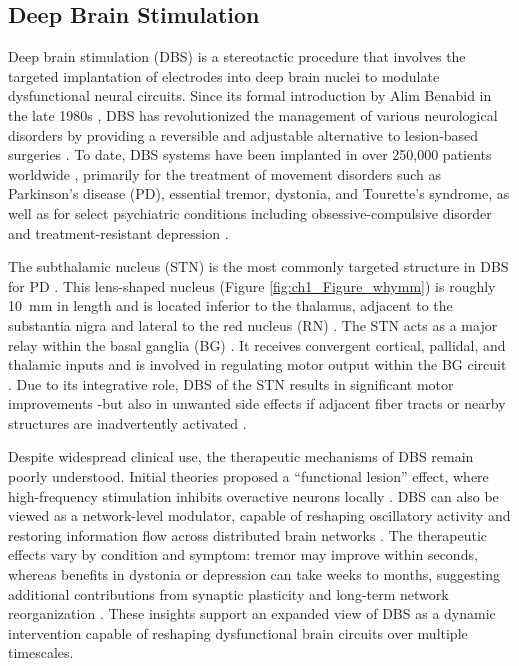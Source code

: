 \subsection{Deep Brain Stimulation}
Deep brain stimulation (DBS) is a stereotactic procedure that involves the targeted implantation of electrodes into deep brain nuclei to modulate dysfunctional neural circuits. Since its formal introduction by Alim Benabid in the late 1980s \cite{Benabid1987-mp}, DBS has revolutionized the management of various neurological disorders by providing a reversible and adjustable alternative to lesion-based surgeries \cite{Limousin1990-oz,The-Deep-Brain-Stimulation-for-Parkinson-s-Disease-Study-Group2001-ss}. To date, DBS systems have been implanted in over 250,000 patients worldwide \cite{Schulder2023-aj}, primarily for the treatment of movement disorders such as Parkinson's disease (PD), essential tremor, dystonia, and Tourette’s syndrome, as well as for select psychiatric conditions including obsessive-compulsive disorder and treatment-resistant depression \cite{Lozano2019-dv}.

The subthalamic nucleus (STN) is the most commonly targeted structure in DBS for PD \cite{Lozano2019-dv}. This lens-shaped nucleus (Figure \ref{fig:ch1_Figure_whymm}) is roughly 10~mm in length and is located inferior to the thalamus, adjacent to the substantia nigra and lateral to the red nucleus (RN) \cite{Prasad2024-hi}. The STN acts as a major relay within the basal ganglia (BG) \cite{DeLong2007-cv}. It receives convergent cortical, pallidal, and thalamic inputs and is involved in regulating motor output within the BG circuit \cite{DeLong2007-cv,Jeon2022-wg}. Due to its integrative role, DBS of the STN results in significant motor improvements \cite{Hermann2024-tr}-but also in unwanted side effects if adjacent fiber tracts or nearby structures are inadvertently activated \cite{Kiss2007-mu,Reich2022-jf}.

Despite widespread clinical use, the therapeutic mechanisms of DBS remain poorly understood. Initial theories proposed a “functional lesion” effect, where high-frequency stimulation inhibits overactive neurons locally \cite{Benabid1987-mp, Benabid1996-jd}. DBS can also be viewed as a network-level modulator, capable of reshaping oscillatory activity and restoring information flow across distributed brain networks \cite{Miocinovic2013-rs,Herrington2016-xr}. The therapeutic effects vary by condition and symptom: tremor may improve within seconds, whereas benefits in dystonia or depression can take weeks to months, suggesting additional contributions from synaptic plasticity and long-term network reorganization \cite{Ashkan2017-hb}. These insights support an expanded view of DBS as a dynamic intervention capable of reshaping dysfunctional brain circuits over multiple timescales.

